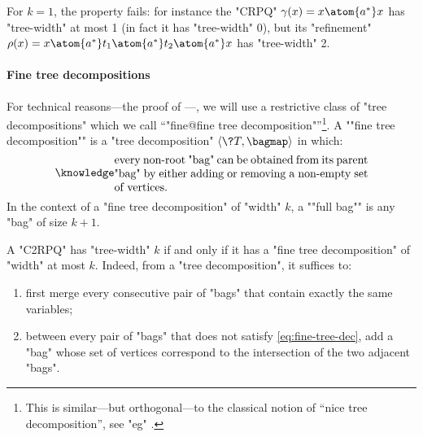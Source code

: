 For $k=1$, the property fails: for instance the "CRPQ" $\gamma(x) = x \atom{a^*} x$
has "tree-width" at most 1 (in fact it has "tree-width" 0), but its "refinement"
$\rho(x) = x \atom{a^*} t_1 \atom{a^*} t_2 \atom{a^*} x$ has "tree-width" 2.

\paragraph*{Fine tree decompositions}
\AP For technical reasons---the proof of ---, we will use a restrictive class of "tree decompositions" which we call ``"fine@fine tree decomposition"''\footnote{This is similar---but orthogonal---to the classical notion of
``nice tree decomposition'', see "eg" \cite[Definition 13.1.4, page 149]{Kloks1994Treewidth}.}. A \AP""fine tree decomposition"" is a "tree decomposition" $\tup{\?T, \bagmap}$ in which:
\begin{equation}
	\AP\label{eq:fine-tree-dec}
	\parbox{.65\linewidth}{every non-root "bag" can be obtained from its parent "bag" by
	either adding or removing a non-empty set of vertices.}%
\end{equation}
In the context of a "fine tree decomposition" of "width" $k$, a \AP""full bag"" is any "bag" of size $k+1$.

A "C2RPQ" has "tree-width" $k$ if and only if it has a "fine tree decomposition" of "width" at most $k$. Indeed, from a "tree decomposition", it suffices to:
\begin{enumerate}
	\item first merge every consecutive pair of "bags" that contain exactly the same variables;
	\item between every pair of "bags"
	that does not satisfy \eqref{eq:fine-tree-dec}, add a "bag" whose set of vertices
	correspond to the intersection of the two adjacent "bags".
\end{enumerate}